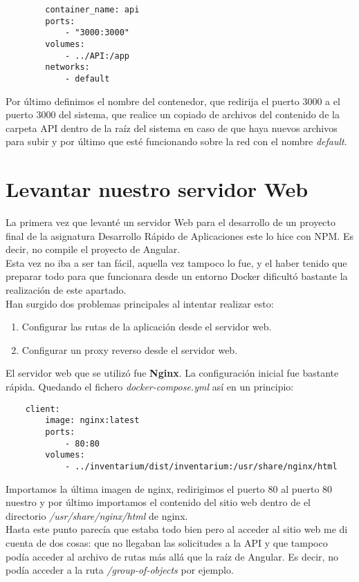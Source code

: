 \begin{verbatim}
        container_name: api
        ports:
            - "3000:3000"
        volumes:
            - ../API:/app
        networks:
            - default
\end{verbatim}
Por último definimos el nombre del contenedor, que redirija el puerto 3000 a el puerto 3000 del sistema, que realice un copiado de archivos del contenido de la carpeta API dentro de la raíz del sistema en caso de que haya nuevos archivos para subir y por último que esté funcionando sobre la red con el nombre \textit{default}.

\section{Levantar nuestro servidor Web}
La primera vez que levanté un servidor Web para el desarrollo de un proyecto final de la asignatura Desarrollo Rápido de Aplicaciones este lo hice con NPM. Es decir, no compile el proyecto de Angular.
\\Esta vez no iba a ser tan fácil, aquella vez tampoco lo fue, y el haber tenido que preparar todo para que funcionara desde un entorno Docker dificultó bastante la realización de este apartado.
\\Han surgido dos problemas principales al intentar realizar esto:
\begin{enumerate}
    \item Configurar las rutas de la aplicación desde el servidor web.
    \item Configurar un proxy reverso desde el servidor web.
\end{enumerate}
El servidor web que se utilizó fue \textbf{Nginx}. La configuración inicial fue bastante rápida. Quedando el fichero \textit{docker-compose.yml} así en un principio:
\begin{verbatim}
    client:
        image: nginx:latest
        ports:
            - 80:80
        volumes:
            - ../inventarium/dist/inventarium:/usr/share/nginx/html
\end{verbatim}
Importamos la última imagen de nginx, redirigimos el puerto 80 al puerto 80 nuestro y por último importamos el contenido del sitio web dentro de el directorio \textit{/usr/share/nginx/html} de nginx.
\\Hasta este punto parecía que estaba todo bien pero al acceder al sitio web me di cuenta de dos cosas: que no llegaban las solicitudes a la API y que tampoco podía acceder al archivo de rutas más allá que la raíz de Angular. Es decir, no podía acceder a la ruta \textit{/group-of-objects} por ejemplo.
